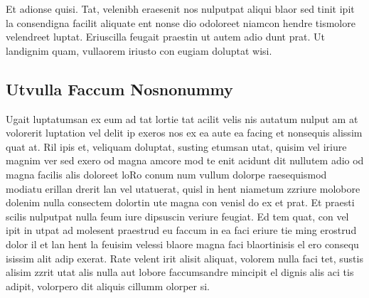 Et adionse quisi. Tat, velenibh eraesenit nos nulputpat aliqui blaor sed tinit ipit la consendigna facilit aliquate ent nonse dio odoloreet niamcon hendre tismolore velendreet luptat. Eriuscilla feugait praestin ut autem adio dunt prat. Ut landignim quam, vullaorem iriusto con eugiam doluptat wisi.

\subsection[Utvulla Faccum Nosnonummy]{Utvulla Faccum Nosnonummy}
Ugait luptatumsan ex eum ad tat lortie tat acilit velis nis autatum nulput am at volorerit luptation vel delit ip exeros nos ex ea aute ea facing et nonsequis alissim quat at. Ril ipis et, veliquam doluptat, susting etumsan utat, quisim vel iriure magnim ver sed exero od magna amcore mod te enit acidunt dit nullutem adio od magna facilis alis doloreet loRo conum num vullum dolorpe raesequismod modiatu erillan drerit lan vel utatuerat, quisl in hent niametum zzriure molobore dolenim nulla consectem dolortin ute magna con venisl do ex et prat. Et praesti scilis nulputpat nulla feum iure dipsuscin veriure feugiat. Ed tem quat, con vel ipit in utpat ad molesent praestrud eu faccum in ea faci eriure tie ming erostrud dolor il et lan hent la feuisim velessi blaore magna faci blaortinisis el ero consequ isissim alit adip exerat. Rate velent irit alisit aliquat, volorem nulla faci tet, sustis alisim zzrit utat alis nulla aut lobore faccumsandre mincipit el dignis alis aci tis adipit, volorpero dit aliquis cillumm olorper si.

